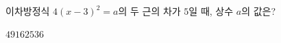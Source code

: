 이차방정식 $4(x-3)^2=a$의 두 근의 차가 $5$일 때, 상수 $a$의 값은?
\begin{choices32}{$4$}{$9$}{$16$}{$25$}{$36$}\end{choices32}
